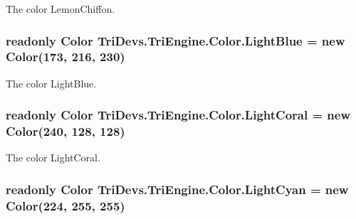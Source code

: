 The color Lemon\-Chiffon. 

\hypertarget{struct_tri_devs_1_1_tri_engine_1_1_color_a74181545b6ec10be3cdf48083f32e04e}{
\subsubsection[{Light\-Blue}]{\setlength{\rightskip}{0pt plus 5cm}readonly {\bf Color} Tri\-Devs.\-Tri\-Engine.\-Color.\-Light\-Blue = new {\bf Color}(173, 216, 230)\hspace{0.3cm}{\ttfamily [static]}}}\label{struct_tri_devs_1_1_tri_engine_1_1_color_a74181545b6ec10be3cdf48083f32e04e}


The color Light\-Blue. 

\hypertarget{struct_tri_devs_1_1_tri_engine_1_1_color_abef0e2d9a436f1f41f32835f1cb6a5c1}{
\subsubsection[{Light\-Coral}]{\setlength{\rightskip}{0pt plus 5cm}readonly {\bf Color} Tri\-Devs.\-Tri\-Engine.\-Color.\-Light\-Coral = new {\bf Color}(240, 128, 128)\hspace{0.3cm}{\ttfamily [static]}}}\label{struct_tri_devs_1_1_tri_engine_1_1_color_abef0e2d9a436f1f41f32835f1cb6a5c1}


The color Light\-Coral. 

\hypertarget{struct_tri_devs_1_1_tri_engine_1_1_color_acb264746ac5a5eed0a561f2049135cb8}{
\subsubsection[{Light\-Cyan}]{\setlength{\rightskip}{0pt plus 5cm}readonly {\bf Color} Tri\-Devs.\-Tri\-Engine.\-Color.\-Light\-Cyan = new {\bf Color}(224, 255, 255)\hspace{0.3cm}{\ttfamily [static]}}}\label{struct_tri_devs_1_1_tri_engine_1_1_color_acb264746ac5a5eed0a561f2049135cb8}


